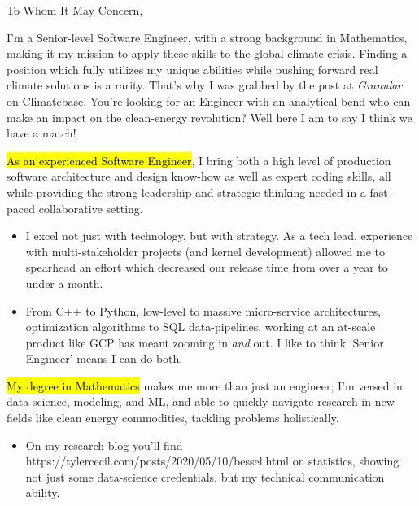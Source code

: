 \documentclass{tc_cv}
\begin{document}

\begin{adjustwidth}{40pt}{40pt}
  \large

  To Whom It May Concern, \par \bigbreak

  I'm a Senior-level Software Engineer, with a strong background in
  Mathematics, making it my mission to apply these skills to the global climate
  crisis. Finding a position which fully utilizes my unique abilities while
  pushing forward real climate solutions is a rarity. That's why I was grabbed
  by the post at \emph{Granular} on Climatebase. You're looking for an Engineer
  with an analytical bend who can make an impact on the clean-energy
  revolution? Well here I am to say I think we have a match! \medbreak

  \hl{As an experienced Software Engineer}, I bring both a high level of
  production software architecture and design know-how as well as expert coding
  skills, all while providing the strong leadership and strategic thinking
  needed in a fast-paced collaborative setting.
  \begin{itemize}

    \item I excel not just with technology, but with strategy. As a tech lead,
      experience with multi-stakeholder projects (and kernel development)
      allowed me to spearhead an effort which decreased our release time from
      over a year to under a month.

    \item From C++ to Python, low-level to massive micro-service architectures,
      optimization algorithms to SQL data-pipelines, working at an at-scale
      product like GCP has meant zooming in \emph{and} out. I like to think
      `Senior Engineer' means I can do both.

  \end{itemize} \medskip

  \hl{My degree in Mathematics} makes me more than just an engineer; I'm versed
  in data science, modeling, and ML, and able to quickly navigate research in
  new fields like clean energy commodities, tackling problems holistically.
  \begin{itemize}

    \item On my research blog you'll find \cite{Jupyter
      notebooks}{https://tylercecil.com/posts/2020/05/10/bessel.html} on
      statistics, showing not just some data-science credentials, but my
      technical communication ability.


\end{itemize}
\end{adjustwidth}
\end{document}
